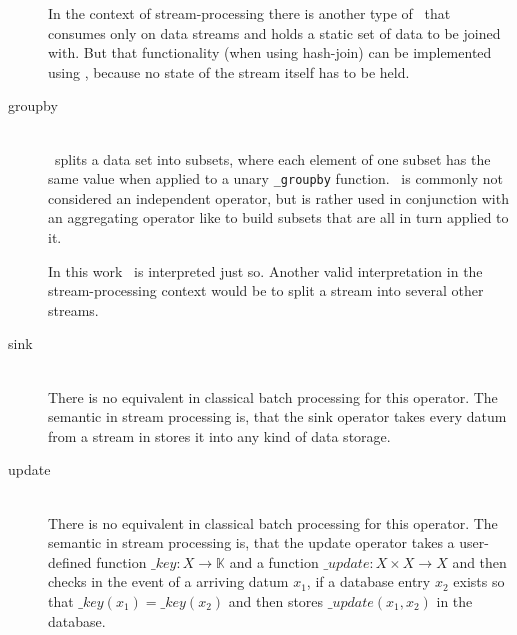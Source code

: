 \begin{description}
In the context of stream-processing there is another type of \join\ that consumes only on data streams and holds a static set of data to be joined with. But that functionality (when using hash-join) can be implemented using \map, because no state of the stream itself has to be held.
	\item[groupby] \hfill \\
	\groupby\ splits a data set into subsets, where each element of one subset has the same value when applied to a unary \texttt{\_groupby} function. \groupby\ is commonly\cite{w3cs:groupby} not considered an independent operator, but is rather used in conjunction with an aggregating operator like \reduce to build subsets that are all in turn applied to it.
	
	In this work \groupby\ is interpreted just so. Another valid interpretation in the stream-processing context would be to split a stream into several other streams.
	\item[sink] \hfill \\
	There is no equivalent in classical batch processing for this operator. The semantic in stream processing is, that the sink operator takes every datum from a stream in stores it into any kind of data storage. 
	\item[update] \hfill \\
  	There is no equivalent in classical batch processing for this operator. The semantic in stream processing is, that the update operator takes a user-defined function $ \_key : X \rightarrow \mathbb{K}$ and a function $ \_update : X \times X \rightarrow X$ and then checks in the event of a arriving datum $x_1$, if a database entry $x_2$ exists so that $\_key(x_1) = \_key(x_2)$ and then stores $\_update(x_1, x_2)$ in the database.

\end{description}

